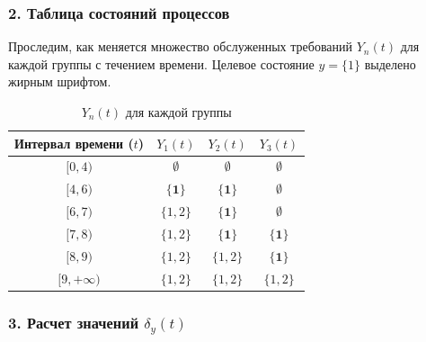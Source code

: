 \documentclass[12pt]{article}
\theoremstyle{plain}
\theoremstyle{definition}
\theoremstyle{remark}
\begin{document}
\subsubsection*{2. Таблица состояний процессов}

Проследим, как меняется множество обслуженных требований $Y_n(t)$ для каждой группы с течением времени. Целевое состояние $y=\{1\}$ выделено жирным шрифтом.

\begin{table}[H]
\centering
\caption{$Y_n(t)$ для каждой группы}
\renewcommand{\arraystretch}{1.2}
\begin{tabular}{|c|c|c|c|}
\hline
\textbf{Интервал времени ($t$)} & \textbf{$Y_1(t)$} & \textbf{$Y_2(t)$} & \textbf{$Y_3(t)$} \\ \hline
$[0, 4)$ & $\emptyset$ & $\emptyset$ & $\emptyset$ \\ \hline
$[4, 6)$ & $\mathbf{\{1\}}$ & $\mathbf{\{1\}}$ & $\emptyset$ \\ \hline
$[6, 7)$ & $\{1, 2\}$ & $\mathbf{\{1\}}$ & $\emptyset$ \\ \hline
$[7, 8)$ & $\{1, 2\}$ & $\mathbf{\{1\}}$ & $\mathbf{\{1\}}$ \\ \hline
$[8, 9)$ & $\{1, 2\}$ & $\{1, 2\}$ & $\mathbf{\{1\}}$ \\ \hline
$[9, +\infty)$ & $\{1, 2\}$ & $\{1, 2\}$ & $\{1, 2\}$ \\ \hline
\end{tabular}
\end{table}

\subsubsection*{3. Расчет значений $\delta_y(t)$}
\end{document}
